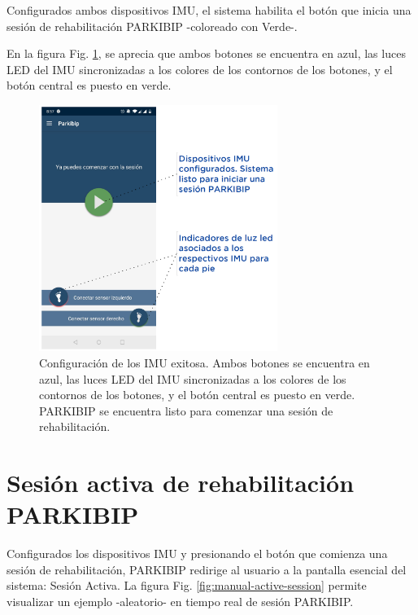 Configurados ambos dispositivos IMU, el sistema habilita el botón que inicia una sesión de rehabilitación PARKIBIP -coloreado con Verde-.

En la figura Fig. \ref{fig:manual-ready}, se aprecia que ambos botones se encuentra en azul, las luces LED del IMU sincronizadas a los colores de los contornos de los botones, y el botón central es puesto en verde.

\newpage

\begin{figure}[H]
 \centering
 \includegraphics[height=8cm]{TESIS/imagenes/user-manual/manual-ready.PNG}
 \caption{Configuración de los IMU exitosa. Ambos botones se encuentra en azul, las luces LED del IMU sincronizadas a los colores de los contornos de los botones, y el botón central es puesto en verde. PARKIBIP se encuentra listo para comenzar una sesión de rehabilitación.}
 \label{fig:manual-ready}
\end{figure}

\section{Sesión activa de rehabilitación PARKIBIP}

Configurados los dispositivos IMU y presionando el botón que comienza una sesión de rehabilitación, PARKIBIP redirige al usuario a la pantalla esencial del sistema: Sesión Activa. La figura Fig. \ref{fig:manual-active-session} permite visualizar un ejemplo -aleatorio- en tiempo real de sesión PARKIBIP.

\newpage

